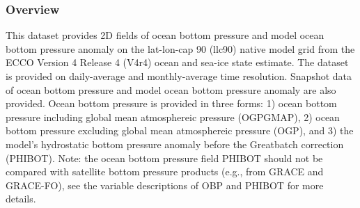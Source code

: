 \subsubsection{Overview}
This dataset provides 2D fields of ocean bottom pressure and model ocean bottom pressure anomaly on the lat-lon-cap 90 (llc90) native model grid from the ECCO Version 4 Release 4 (V4r4) ocean and sea-ice state estimate. The dataset is provided on daily-average and monthly-average time resolution. Snapshot data of ocean bottom pressure and model ocean bottom pressure anomaly are also provided. Ocean bottom pressure is provided in three forms: 1) ocean bottom pressure including global mean atmosphereic pressure (OGPGMAP), 2)  ocean bottom pressure excluding global mean atmosphereic pressure (OGP), and 3) the model's hydrostatic bottom pressure anomaly before the Greatbatch correction (PHIBOT).  Note: the ocean bottom pressure field PHIBOT should not be compared with satellite bottom pressure products (e.g., from GRACE and GRACE-FO), see the variable descriptions of OBP and PHIBOT for more details. 
